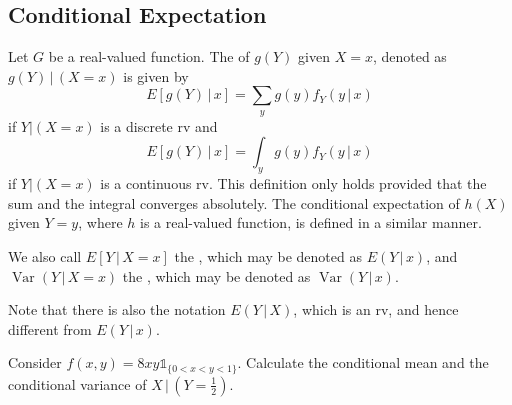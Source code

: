 \documentclass[notoc,notitlepage]{tufte-book}
\DeclareMathOperator{\Var}{Var }
\begin{document}

\subsection{Conditional Expectation}%
\label{sub:conditional_expectation}

\begin{defn}
\label{defn:conditional_expectation}
  Let $G$ be a real-valued function. The  of $g(Y)$ given $X = x$, denoted as $g(Y) \, | \, \left( X = x \right)$ is given by
  \begin{equation*}
    E \left[ g(Y) \, | \, x \right] = \sum_{y} g(y) f_Y( y \, | \, x )
  \end{equation*}
  if $Y | (X = x)$ is a discrete rv and
  \begin{equation*}
    E \left[ g(Y) \, | \, x \right] = \int_{y} g(y) f_Y( y \, | \, x )
  \end{equation*}
  if $Y | (X = x)$ is a continuous rv. This definition only holds provided that the sum and the integral converges absolutely. The conditional expectation of $h(X)$ given $Y = y$, where $h$ is a real-valued function, is defined in a similar manner.

  We also call $E[ Y \, | \, X = x ]$ the , which may be denoted as $E( Y \, | \, x )$, and $\Var(Y \, | \, X = x)$ the , which may be denoted as $\Var(Y \, | \, x)$.
\end{defn}

\begin{note}
  Note that there is also the notation $E(Y \, | \, X)$, which is an rv, and hence different from $E(Y \, | \, x)$.
\end{note}

\begin{eg}[Example 3.21]
  Consider $f(x, y) = 8xy \mathbb{1}_{\{0 < x < y < 1\}}$. Calculate the conditional mean and the conditional variance of $X \, | \, \left( Y = \frac{1}{2} \right)$.
\end{eg}
\end{document}
